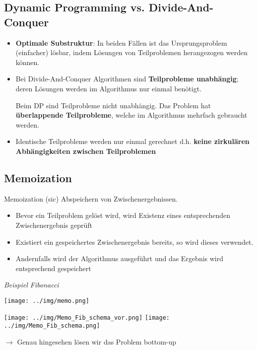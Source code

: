 \documentclass[german]{latex4ei/latex4ei_sheet}
\begin{document}
\begin{sectionbox}
\subsection{Dynamic Programming vs. Divide-And-Conquer}\smallskip
\begin{itemize}
    \item \textbf{Optimale Substruktur}: In beiden Fällen ist das Ursprungsproblem (einfacher) lösbar, indem Lösungen von Teilproblemen herangezogen werden können.
    \item Bei Divide-And-Conquer Algorithmen sind \textbf{Teilprobleme unabhängig}; deren Lösungen werden im Algorithmus nur einmal benötigt.\par
    Beim DP sind Teilprobleme nicht unabhängig. Das Problem hat \textbf{überlappende Teilprobleme}, welche im Algorithmus mehrfach gebraucht werden.
    \item Identische Teilprobleme werden nur einmal gerechnet d.h. \textbf{keine zirkulären Abhängigkeiten zwischen Teilproblemen}
\end{itemize}\smallskip
\end{sectionbox}

\begin{sectionbox}
\subsection{Memoization}\smallskip
Memoization (sic) Abspeichern von Zwischenergebnissen.
\begin{itemize}
    \item Bevor ein Teilproblem gelöst wird, wird Existenz eines entsprechenden Zwischenergebnis geprüft
    \item Existiert ein gespeichertes Zwischenergebnis bereits, so wird dieses verwendet.
    \item Andernfalls wird der Algorithmus ausgeführt und das Ergebnis wird entsprechend gespeichert
\end{itemize}\smallskip

\textit{Beispiel Fibonacci}\par
\begin{center}
    \texttt{[image: ../img/memo.png]}\par\smallskip
    \texttt{[image: ../img/Memo\_Fib\_schema\_vor.png]}
    \texttt{[image: ../img/Memo\_Fib\_schema.png]}
\end{center}
$\rightarrow$ Genau hingesehen lösen wir das Problem bottom-up

\end{sectionbox}
\end{document}
